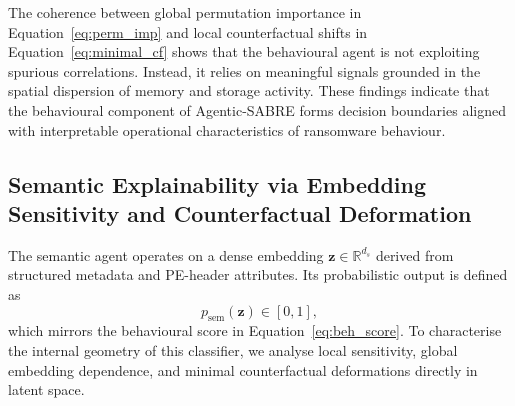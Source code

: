 \documentclass[3p]{elsarticle}
\begin{document}
\begin{table}[t]
\centering
{}
\caption{Representative behavioural counterfactuals generated using the minimal-perturbation formulation in Equation~\eqref{eq:minimal_cf}. Relative changes are computed using Equation~\eqref{eq:count1}.}
\label{tab:beh_cf_summary}
\end{table}

The coherence between global permutation importance in Equation~\eqref{eq:perm_imp} and local counterfactual shifts in Equation~\eqref{eq:minimal_cf} shows that the behavioural agent is not exploiting spurious correlations. Instead, it relies on meaningful signals grounded in the spatial dispersion of memory and storage activity. These findings indicate that the behavioural component of Agentic-SABRE forms decision boundaries aligned with interpretable operational characteristics of ransomware behaviour.

\subsection{Semantic Explainability via Embedding Sensitivity and Counterfactual Deformation}
\label{sec:semantic_explainability}

The semantic agent operates on a dense embedding $\mathbf{z}\in\mathbb{R}^{d_s}$ derived from structured metadata and PE-header attributes.
Its probabilistic output is defined as
\begin{equation}
p_{\mathrm{sem}}(\mathbf{z}) \in [0,1],
\label{eq:sem_pred}
\end{equation}
which mirrors the behavioural score in Equation~\eqref{eq:beh_score}.
To characterise the internal geometry of this classifier, we analyse local sensitivity,
global embedding dependence, and minimal counterfactual deformations directly in latent space.
\end{document}
